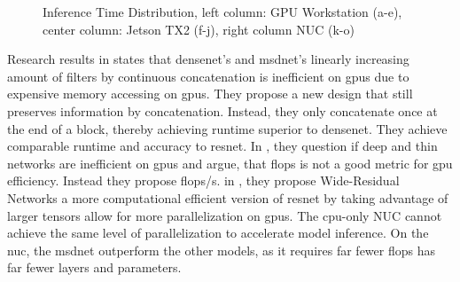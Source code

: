 \begin{figure}
\begin{minipage}{.33\textwidth}
		\hfill
		\hfill
	\end{minipage}
	\caption[Platform Inference Time of \gls{dnn}s]{Inference Time Distribution, left column: GPU Workstation (a-e), center column: Jetson TX2 (f-j), right column NUC (k-o)}
	\label{fig:inference-time-dist}
\end{figure}

Research results in \cite{lee_energy_2019} states that \gls{densenet}'s and \gls{msdnet}’s linearly increasing amount of filters by continuous concatenation is inefficient on \gls{gpu}s due to expensive memory accessing on \gls{gpu}s. They propose a new design that still preserves information by concatenation. Instead, they only concatenate once at the end of a block, thereby achieving runtime superior to \gls{densenet}. They achieve comparable runtime and accuracy to \gls{resnet}. In \cite{lee_energy_2019}, they question if deep and thin networks are inefficient on \gls{gpu}s and argue, that \gls{flop}s is not a good metric for \gls{gpu} efficiency. Instead they propose \gls{flop}s/s. in \cite{zagoruyko_wide_2017}, they propose Wide-Residual Networks a more computational efficient version of \gls{resnet} by taking advantage of larger tensors allow for more parallelization on \gls{gpu}s. The \gls{cpu}-only NUC cannot achieve the same level of parallelization to accelerate model inference. On the \gls{nuc}, the \gls{msdnet} outperform the other models, as it requires far fewer \gls{flop}s has far fewer layers and parameters. 
